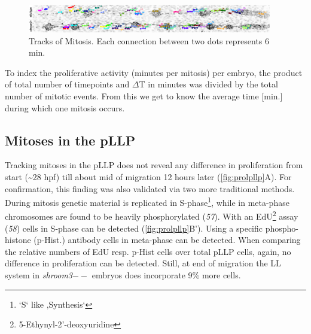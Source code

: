 \documentclass[11pt,singlespacinge,twoside]{reedthesis} %
\begin{document}
\begin{figure}

{\centering \includegraphics[width=0.95\textwidth]{figures/results/02_proliferation/prol_labs} 

}

\caption[Tracks of Mitosis]{Tracks of Mitosis. Each connection between two dots represents 6 min.}\label{fig:prollabs}
\end{figure}
To index the proliferative activity (minutes per mitosis) per embryo, the product of total number of timepoints and \(\Delta\)T in minutes was divided by the total number of mitotic events. From this we get to know the average time {[}min.{]} during which one mitosis occurs.

\newline

\hypertarget{mitoses-in-the-pllp}{%
\subsection{Mitoses in the pLLP}\label{mitoses-in-the-pllp}}

Tracking mitoses in the pLLP does not reveal any difference in proliferation from start (\textasciitilde{}28 hpf) till about mid of migration 12 hours later (\ref{fig:prolpllp}A). For confirmation, this finding was also validated via two more traditional methods. During mitosis genetic material is replicated in S-phase\footnote{`S` like ‚Synthesis`}, while in meta-phase chromosomes are found to be heavily phosphorylated (\emph{57}). With an EdU\footnote{5-Ethynyl-2'-deoxyuridine} assay (\emph{58}) cells in S-phase can be detected (\ref{fig:prolpllp}B'). Using a specific phospho-histone (p-Hist.) antibody cells in meta-phase can be detected. When comparing the relative numbers of EdU resp. p-Hist cells over total pLLP cells, again, no difference in proliferation can be detected. Still, at end of migration the LL system in \emph{shroom3}\(--\) embryos does incorporate 9\(\%\) more cells.
\end{document}

